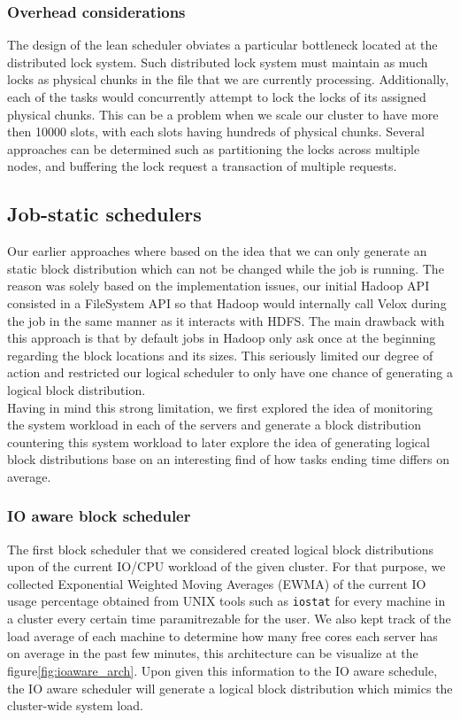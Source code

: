 \subsubsection{Overhead considerations}

The design of the lean scheduler obviates a particular bottleneck located at
the distributed lock system. Such distributed lock system must maintain as much
locks as physical chunks in the file that we are currently processing.
Additionally, each of the tasks would concurrently attempt to lock the locks of
its assigned physical chunks. This can be a problem when we scale our cluster
to have more then 10000 slots, with each slots having hundreds of physical
chunks. Several approaches can be determined such as partitioning the locks
across multiple nodes, and buffering the lock request a transaction of multiple
requests.  

\subsection{Job-static schedulers}

Our earlier approaches where based on the idea that we can only generate an
static block distribution which can not be changed while the job is running.
The reason was solely based on the implementation issues, our initial Hadoop
API consisted in a FileSystem API so that Hadoop would internally call Velox
during the job in the same manner as it interacts with HDFS. The main drawback
with this approach is that by default jobs in Hadoop only ask once at the
beginning regarding the block locations and its sizes. This seriously limited
our degree of action and restricted our logical scheduler to only have one
chance of generating a logical block distribution. \\

Having in mind this strong limitation, we first explored the idea of monitoring
the system workload in each of the servers and generate a block distribution
countering this system workload to later explore the idea of generating logical
block distributions base on an interesting find of how tasks ending time
differs on average.

\subsubsection{IO aware block scheduler}

The first block scheduler that we considered created logical block
distributions upon of the current IO/CPU workload of the given cluster. For
that purpose, we collected Exponential Weighted Moving Averages (EWMA) of the
current IO usage percentage obtained from UNIX tools such as \texttt{iostat}
for every machine in a cluster every certain time paramitrezable for the user.
We also kept track of the load average of each machine to determine how many
free cores each server has on average in the past few minutes, this
architecture can be visualize at the figure\ref{fig:ioaware_arch}.  Upon given
this information to the IO aware schedule, the IO aware scheduler will generate
a logical block distribution which mimics the cluster-wide system load. \\ 

